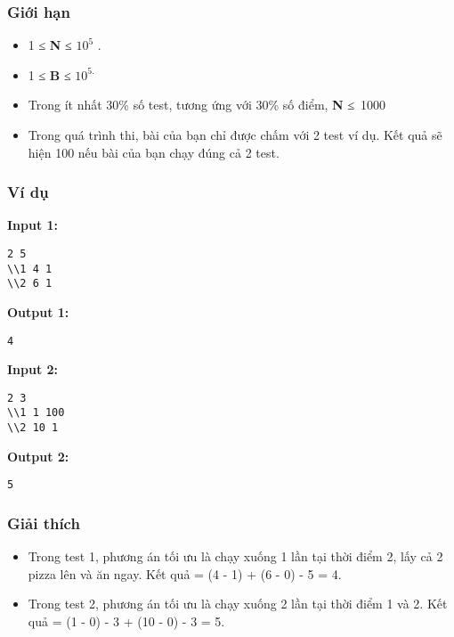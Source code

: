 \subsubsection{   Giới hạn  }
\begin{itemize}
	\item     1         ≤     \textbf{      N     }      ≤ $10^{5}$      .     
	\item     1 ≤    \textbf{     B    }    ≤ $10^{5.}$
	\item     Trong ít nhất 30\% số test, tương ứng với 30\% số điểm,    \textbf{     N    }    ≤ 1000   
	\item     Trong quá trình thi, bài của bạn chỉ được chấm với 2 test ví dụ. Kết quả sẽ hiện 100 nếu bài của bạn chạy đúng cả 2 test.   
\end{itemize}

\subsubsection{   Ví dụ  }

\textbf{    Input 1:   }
\begin{verbatim}
2 5
\\1 4 1
\\2 6 1\end{verbatim}

\textbf{    Output 1:   }
\begin{verbatim}
4\end{verbatim}

\textbf{    Input 2:   }
\begin{verbatim}
2 3
\\1 1 100
\\2 10 1\end{verbatim}

\textbf{    Output 2:   }
\begin{verbatim}
5\end{verbatim}

\subsubsection{   Giải thích  }
\begin{itemize}
	\item     Trong test 1, phương án tối ưu là chạy xuống 1 lần tại thời điểm 2, lấy cả 2 pizza lên và ăn ngay. Kết quả = (4 - 1) + (6 - 0) - 5 = 4.   
	\item     Trong test 2, phương án tối ưu là chạy xuống 2 lần tại thời điểm 1 và 2. Kết quả = (1 - 0) - 3 + (10 - 0) - 3 = 5.   
\end{itemize}
